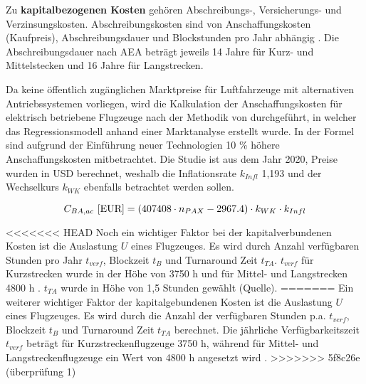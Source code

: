  

Zu \textbf{kapitalbezogenen Kosten} gehören Abschreibungs-, Versicherungs- und Verzinsungskosten. 
Abschreibungskosten sind von Anschaffungskosten (Kaufpreis), Abschreibungsdauer und Blockstunden pro Jahr abhängig \cite{conrady2019luftverkehr}.
Die Abschreibungsdauer nach AEA beträgt jeweils 14 Jahre für Kurz- und Mittelstecken und 16 Jahre für Langstrecken.

Da keine öffentlich zugänglichen Marktpreise für Luftfahrzeuge mit alternativen Antriebssystemen vorliegen, 
wird die Kalkulation der Anschaffungskosten für elektrisch betriebene Flugzeuge nach der Methodik von \cite{monjon2020conceptual} durchgeführt, 
in welcher das Regressionsmodell anhand einer Marktanalyse erstellt wurde. 
In der Formel sind aufgrund der Einführung neuer Technologien 10 \% höhere Anschaffungskosten mitbetrachtet. 
Die Studie ist aus dem Jahr 2020, Preise wurden in USD berechnet, weshalb die Inflationsrate $k_{Infl}$ 1,193 und
der Wechselkurs $k_{WK}$ ebenfalls betrachtet werden sollen.

\begin{equation}
   {C_{BA,ac} ~[\text{EUR}]} = (407408 \cdot n_{PAX} - 2967.4) \cdot k_{WK} \cdot {k_{Infl}}\\
   \label{price BA}
\end{equation}

<<<<<<< HEAD
Noch ein wichtiger Faktor bei der kapitalverbundenen Kosten ist die Auslastung $U$ eines Flugzeuges. Es wird durch Anzahl 
verfügbaren Stunden pro Jahr $t_{verf}$, Blockzeit $t_B$ und Turnaround Zeit $t_{TA}$. $t_{verf}$ für Kurzstrecken wurde 
in der Höhe von 3750 h und für Mittel- und Langstrecken 4800 h \cite{scholz_design_evaluation_doc}. $t_{TA}$ wurde in Höhe von 1,5
Stunden gewählt (Quelle).
=======
Ein weiterer wichtiger Faktor der kapitalgebundenen Kosten ist die Auslastung $U$ eines Flugzeuges. Es wird durch die Anzahl 
der verfügbaren Stunden p.a. $t_{verf}$, Blockzeit $t_B$ und Turnaround Zeit $t_{TA}$ berechnet. 
Die jährliche Verfügbarkeitszeit $t_{verf}$ beträgt für Kurzstreckenflugzeuge 3750 h, 
während für Mittel- und Langstreckenflugzeuge ein Wert von 4800 h angesetzt wird \cite{scholz_design_evaluation_doc}.
>>>>>>> 5f8c26e (überprüfung 1)

